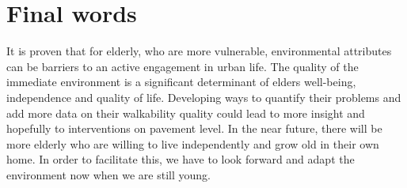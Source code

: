 \section{Final words}

It is proven that for elderly, who are more vulnerable, environmental attributes can be barriers to an active engagement in urban life. The quality of the immediate environment is a significant determinant of elders well-being, independence and quality of life. Developing ways to quantify their problems and add more data on their walkability quality could lead to more insight and hopefully to interventions on pavement level. In the near future, there will be more elderly who are willing to live independently and grow old in their own home. In order to facilitate this, we have to look forward and adapt the environment now when we are still young. 









 

